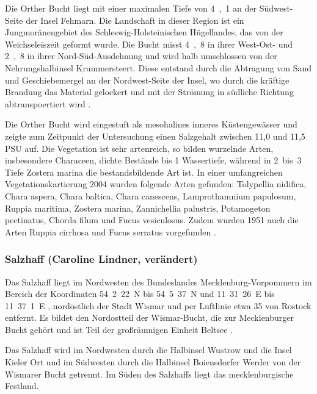 Die Orther Bucht liegt mit einer maximalen Tiefe von \unit{4,1}{\metre} \citep{seekarte_fehmarn_sund_1902} an der Südwest- Seite der Insel Fehmarn. Die Landschaft in dieser Region ist ein Jungmoränengebiet des Schleswig-Holsteinischen Hügellandes, das von der Weichseleiszeit geformt wurde. Die Bucht misst \unit{4,8}{\kilo\metre} in ihrer West-Ost- und \unit{2,8}{\kilo\metre} in ihrer Nord-Süd-Ausdehnung und wird halb umschlossen von der Nehrungshalbinsel Krummersteert. Diese entstand durch die Abtragung von Sand und Geschiebemergel an der Nordwest-Seite der Insel, wo durch die kräftige Brandung das Material gelockert und mit der Strömung in südliche Richtung abtranspoertiert wird \citep{eschwe_2005}.

Die Orther Bucht wird eingestuft als mesohalines inneres Küstengewässer \citep{reimers_2005} und zeigte zum Zeitpunkt der Untersuchung einen Salzgehalt zwischen 11,0 und 11,5 PSU auf.
Die Vegetation ist sehr artenreich, so bilden wurzelnde Arten, insbesondere Characeen, dichte Bestände bis \unit{1}{\metre} Wassertiefe, während in \unit{2 bis 3}{\metre} Tiefe Zostera marina die bestandsbildende Art ist. In einer umfangreichen Vegetationskartierung 2004 wurden folgende Arten gefunden: Tolypellia nidifica, Chara aspera, Chara baltica, Chara canescens, Lamprothamnium papulosum, Ruppia maritima, Zostera marina, Zannichellia palustris, Potamogeton pectinatus, Chorda filum und Fucus vesiculosus. Zudem wurden 1951 auch die Arten Ruppia cirrhosa und Fucus serratus vorgefunden \citep{mertens_2007}.



\subsubsection{Salzhaff (Caroline Lindner, verändert)}

Das Salzhaff liegt im Nordwesten des Bundeslandes Mecklenburg-Vorpommern im Bereich der Koordinaten 54\textdegree\ 2\textquotesingle\ 22\dq\ N bis 54\textdegree\ 5\textquotesingle\ 37\dq\ N und 11\textdegree\ 31\textquotesingle\ 26\dq\ E bis 11\textdegree\ 37\textquotesingle\ 1\dq\ E \citep{nathansen_2014}, nordöstlich der Stadt Wismar und per Luftlinie etwa \unit{35}{\kilo\metre} von Rostock entfernt. Es bildet den Nordostteil der Wismar-Bucht, die zur Mecklenburger Bucht gehört und ist Teil der großräumigen Einheit Beltsee \cite{biele_1997}.

Das Salzhaff wird im Nordwesten durch die Halbinsel Wustrow und die Insel Kieler Ort und im Südwesten durch die Halbinsel Boiensdorfer Werder von der Wismarer Bucht getrennt. Im Süden des Salzhaffs liegt das mecklenburgische Festland.

